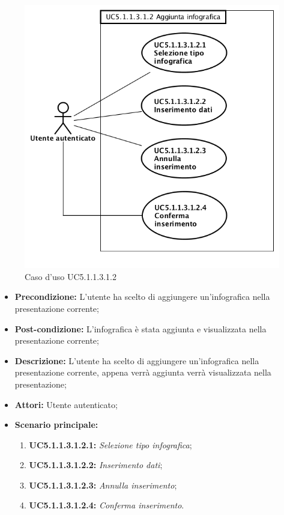 \begin{figure}[h]
	\begin{center}
	\includegraphics[scale=0.4]{diagram/UC5-1-1-3-1-2.png}
	\caption{Caso d'uso UC5.1.1.3.1.2}
	\end{center}
\end{figure}
\begin{itemize}
	\item \textbf{Precondizione:} L'utente ha scelto di aggiungere un'infografica  nella presentazione corrente;
	\item \textbf{Post-condizione:} L'infografica è stata aggiunta e visualizzata nella presentazione corrente;
	\item \textbf{Descrizione:} L'utente ha scelto di aggiungere un'infografica nella presentazione corrente, appena verrà aggiunta verrà visualizzata nella presentazione;
	\item \textbf{Attori:} Utente autenticato;
	\item \textbf{Scenario principale:}
	\begin{enumerate}
		\item \textbf{ UC5.1.1.3.1.2.1:} \textit{ Selezione tipo infografica};
		\item \textbf{ UC5.1.1.3.1.2.2:} \textit{ Inserimento dati};
		\item \textbf{ UC5.1.1.3.1.2.3:} \textit{ Annulla inserimento};
		\item \textbf{ UC5.1.1.3.1.2.4:} \textit{ Conferma inserimento}.
	\end{enumerate}
\end{itemize}
